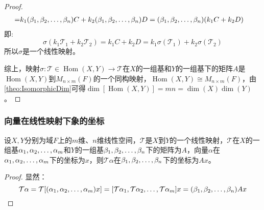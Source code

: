 \begin{proof}
\begin{align*}
		=&k_1(\beta_1, \beta_2, \dots, \beta_{n})C+k_2(\beta_1, \beta_2, \dots, \beta_{n})D=(\beta_1, \beta_2, \dots, \beta_{n})(k_1C+k_2D)
	\end{align*}
	即:
	\begin{equation*}
		\sigma(k_1\mathcal{T}_1+k_2\mathcal{T}_2)=k_1C+k_2D=k_1\sigma(\mathcal{T}_1)+k_2\sigma(\mathcal{T}_2)
	\end{equation*}
	所以$\sigma$是一个线性映射。\par
	综上，映射$\sigma:\mathcal{T}\in\operatorname{Hom}(X,Y)\longrightarrow\mathcal{T}$在$X$的一组基和$Y$的一组基下的矩阵$A$是$\operatorname{Hom}(X,Y)$到$M_{n\times m}(F)$的一个同构映射，$\operatorname{Hom}(X,Y)\cong M_{n\times m}(F)$，由\cref{theo:IsomorphicDim}可得$\dim[\operatorname{Hom}(X,Y)]=mn=\dim(X)\dim(Y)$。
\end{proof}
\subsubsection{向量在线性映射下象的坐标}
\begin{theorem}\label{theo:LinearMappingCoordinate}
	设$X,Y$分别为域$F$上的$m$维、$n$维线性空间，$\mathcal{T}$是$X$到$Y$的一个线性映射，$\mathcal{T}$在$X$的一组基$\alpha_1, \alpha_2, \dots, \alpha_{m}$和$Y$的一组基$\beta_1, \beta_2, \dots, \beta_{n}$下的矩阵为$A$，向量$\alpha$在$\alpha_1, \alpha_2, \dots, \alpha_{m}$下的坐标为$x$，则$\mathcal{T}\alpha$在$\beta_1, \beta_2, \dots, \beta_{n}$下的坐标为$Ax$。
\end{theorem}
\begin{proof}
	显然：
	\begin{equation*}
		\mathcal{T}\alpha=\mathcal{T}[(\alpha_1, \alpha_2, \dots, \alpha_{m})x]=[\mathcal{T}\alpha_1, \mathcal{T}\alpha_2, \dots, \mathcal{T}\alpha_{m}]x=(\beta_1, \beta_2, \dots, \beta_{n})Ax\qedhere
	\end{equation*}
\end{proof}

